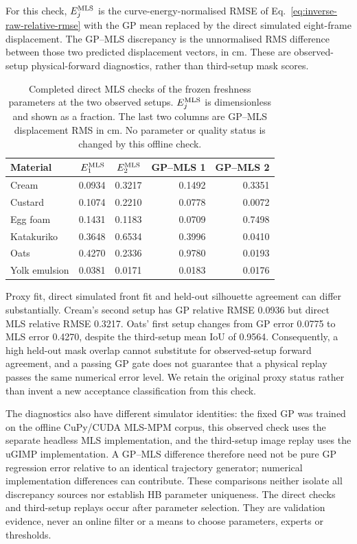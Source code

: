 For this check, $E_j^{\rm MLS}$ is the curve-energy-normalised RMSE of
Eq.~\eqref{eq:inverse-raw-relative-rmse} with the GP mean replaced by
the direct simulated eight-frame displacement. The GP--MLS discrepancy
is the unnormalised RMS difference between those two predicted
displacement vectors, in cm. These are observed-setup physical-forward
diagnostics, rather than third-setup mask scores.

\begin{table}[!htbp]
\centering\footnotesize
\setlength{\tabcolsep}{4pt}
\caption{Completed direct MLS checks of the frozen freshness parameters
at the two observed setups. $E_j^{\rm MLS}$ is dimensionless and shown
as a fraction. The last two columns are GP--MLS displacement RMS in cm.
No parameter or quality status is changed by this offline check.}
\label{tab:freshness-observed-mls}
\begin{tabular}{@{}lrrrr@{}}
\toprule
Material & $E_1^{\rm MLS}$ & $E_2^{\rm MLS}$
 & GP--MLS 1 & GP--MLS 2\\
\midrule
Cream & 0.0934 & 0.3217 & 0.1492 & 0.3351\\
Custard & 0.1074 & 0.2210 & 0.0778 & 0.0072\\
Egg foam & 0.1431 & 0.1183 & 0.0709 & 0.7498\\
Katakuriko & 0.3648 & 0.6534 & 0.3996 & 0.0410\\
Oats & 0.4270 & 0.2336 & 0.9780 & 0.0193\\
Yolk emulsion & 0.0381 & 0.0171 & 0.0183 & 0.0176\\
\bottomrule
\end{tabular}
\end{table}

Proxy fit, direct simulated front fit and held-out silhouette agreement
can differ substantially. Cream's second setup has GP relative RMSE
0.0936 but direct MLS relative RMSE 0.3217. Oats' first setup changes
from GP error 0.0775 to MLS error 0.4270, despite the third-setup
mean IoU of 0.9564. Consequently, a high held-out mask overlap cannot
substitute for observed-setup forward agreement, and a passing GP gate
does not guarantee that a physical replay passes the same numerical
error level. We retain the original proxy status rather than invent
a new acceptance classification from this check.

The diagnostics also have different simulator identities: the fixed
GP was trained on the offline CuPy/CUDA MLS-MPM corpus, this observed
check uses the separate headless MLS implementation, and the third-setup
image replay uses the uGIMP implementation. A GP--MLS
difference therefore need not be pure GP regression error relative to
an identical trajectory generator; numerical implementation differences
can contribute. These comparisons neither isolate all discrepancy
sources nor establish HB parameter uniqueness.
The direct checks and third-setup replays occur after parameter selection. They are
validation evidence, never an online filter or a means to choose
parameters, experts or thresholds.




